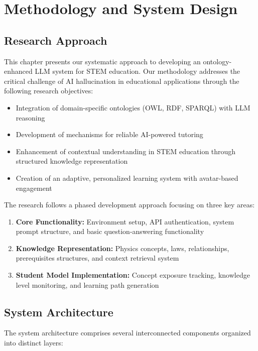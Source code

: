 \chapter{Methodology and System Design}
\label{chap:methodology}

\section{Research Approach}
\label{sec:research-approach}
This chapter presents our systematic approach to developing an ontology-enhanced LLM system for STEM education. Our methodology addresses the critical challenge of AI hallucination in educational applications through the following research objectives:

\begin{itemize}
    \item Integration of domain-specific ontologies (OWL, RDF, SPARQL) with LLM reasoning \cite{doubletaken2024llm}
    \item Development of mechanisms for reliable AI-powered tutoring \cite{ji2023survey}
    \item Enhancement of contextual understanding in STEM education through structured knowledge representation
    \item Creation of an adaptive, personalized learning system with avatar-based engagement
\end{itemize}

The research follows a phased development approach focusing on three key areas:
\begin{enumerate}
    \item \textbf{Core Functionality:} Environment setup, API authentication, system prompt structure, and basic question-answering functionality
    \item \textbf{Knowledge Representation:} Physics concepts, laws, relationships, prerequisites structures, and context retrieval system
    \item \textbf{Student Model Implementation:} Concept exposure tracking, knowledge level monitoring, and learning path generation
\end{enumerate}

\section{System Architecture}
\label{sec:system-architecture}

The system architecture comprises several interconnected components organized into distinct layers:

